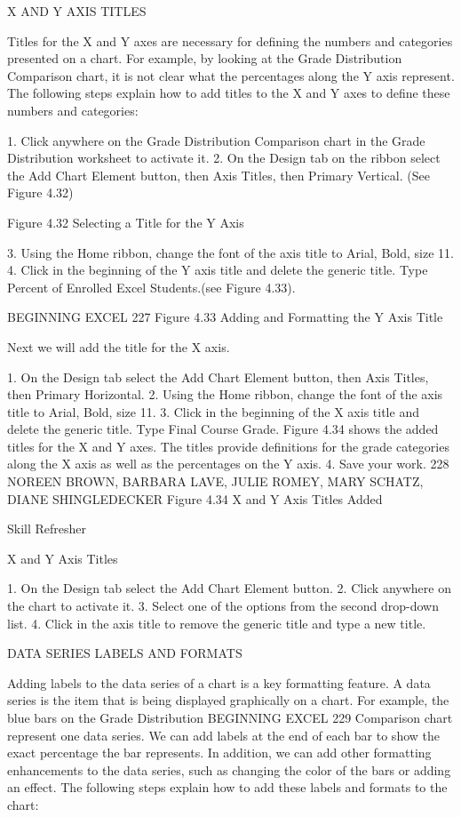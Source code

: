 X AND Y AXIS TITLES

Titles for the X and Y axes are necessary for defining the numbers and categories presented on a
chart. For example, by looking at the Grade Distribution Comparison chart, it is not clear what the
percentages along the Y axis represent. The following steps explain how to add titles to the X and Y
axes to define these numbers and categories:

1. Click anywhere on the Grade Distribution Comparison chart in the Grade Distribution
worksheet to activate it.
2. On the Design tab on the ribbon select the Add Chart Element button, then Axis Titles, then
Primary Vertical. (See Figure 4.32)




Figure 4.32 Selecting a Title for the Y Axis


3. Using the Home ribbon, change the font of the axis title to Arial, Bold, size 11.
4. Click in the beginning of the Y axis title and delete the generic title. Type Percent of Enrolled
Excel Students.(see Figure 4.33).




BEGINNING EXCEL 227
Figure 4.33 Adding and Formatting the Y Axis Title


Next we will add the title for the X axis.

1. On the Design tab select the Add Chart Element button, then Axis Titles, then Primary
Horizontal.
2. Using the Home ribbon, change the font of the axis title to Arial, Bold, size 11.
3. Click in the beginning of the X axis title and delete the generic title. Type Final Course Grade.
Figure 4.34 shows the added titles for the X and Y axes. The titles provide definitions for the
grade categories along the X axis as well as the percentages on the Y axis.
4. Save your work.
228 NOREEN BROWN, BARBARA LAVE, JULIE ROMEY, MARY SCHATZ, DIANE SHINGLEDECKER
Figure 4.34 X and Y Axis Titles Added




Skill Refresher


X and Y Axis Titles

1. On the Design tab select the Add Chart Element button.
2. Click anywhere on the chart to activate it.
3. Select one of the options from the second drop-down list.
4. Click in the axis title to remove the generic title and type a new title.



DATA SERIES LABELS AND FORMATS

Adding labels to the data series of a chart is a key formatting feature. A data series is the item
that is being displayed graphically on a chart. For example, the blue bars on the Grade Distribution
BEGINNING EXCEL 229
Comparison chart represent one data series. We can add labels at the end of each bar to show the
exact percentage the bar represents. In addition, we can add other formatting enhancements to the
data series, such as changing the color of the bars or adding an effect. The following steps explain how
to add these labels and formats to the chart:

